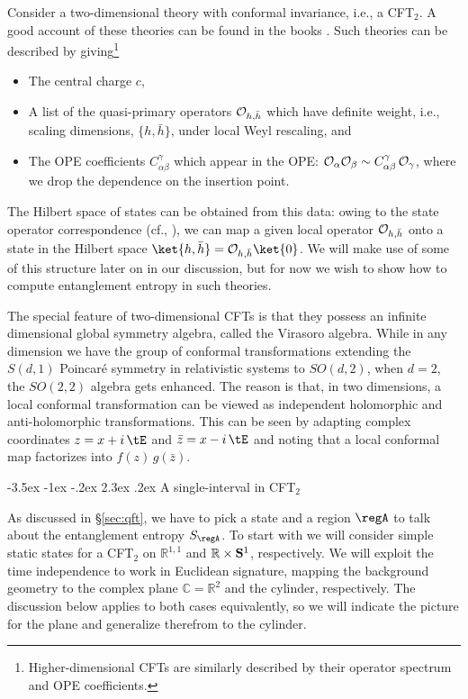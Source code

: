 \documentclass[12pt,openany]{book}
\makeatletter
\renewcommand\section{\@startsection {section}{1}{\z@}%
                                   {-3.5ex \@plus -1ex \@minus -.2ex}%
                                   {2.3ex \@plus.2ex}%
                                   {\normalfont\large\bfseries}}
\makeatother
\begin{document}
Consider a two-dimensional theory with conformal invariance, i.e., a CFT$_2$. A good account of these theories can be found in the books \cite{Ginsparg:1988ui,DiFrancesco:1997nk}. Such theories can be described by giving\footnote{ Higher-dimensional CFTs are similarly described by their operator spectrum and OPE coefficients.}
\begin{itemize}
\item The central charge $c$,
\item A list of the quasi-primary operators ${\cal O}_{h,\bar{h}}$ which have definite weight, i.e., scaling dimensions, $\{h, \bar{h}\}$, under local Weyl rescaling, and
\item The OPE coefficients $C_{\alpha \beta}^\gamma$ which appear in the OPE: ${\cal O}_\alpha {\cal O}_\beta \sim C_{\alpha\beta}^\gamma\, {\cal O}_\gamma$, where we drop the dependence on the insertion point.
\end{itemize}
The Hilbert space of states can be obtained from this data: owing to the state operator correspondence
(cf., \cite{DiFrancesco:1997nk}), we can map a given local operator ${\cal O}_{h, \bar{h}} $ onto a state in the Hilbert space $\ket{h,\bar{h}} =
{\cal O}_{h,\bar{h}} \ket{0}$.
We will make use of some of this structure later on in our discussion, but for now we wish to show how to compute entanglement entropy in such theories.

The special feature of two-dimensional CFTs is that they possess an infinite dimensional global symmetry algebra, called the Virasoro algebra. While in any dimension we have the group of conformal transformations extending the $S(d,1)$ Poincar\'e symmetry in relativistic systems to $SO(d,2)$, when $d=2$, the $SO(2,2)$ algebra gets enhanced. The reason is that, in two dimensions, a local conformal transformation can be viewed as independent holomorphic and anti-holomorphic transformations. This can be seen by adapting complex coordinates $z = x+ i\,\tE$ and $\bar{z} = x-i\,\tE$ and noting that a local conformal map factorizes into $f(z) \, g(\bar{z})$.  


\section{A single-interval in CFT$_2$}

As discussed in \S\ref{sec:qft}, we have to pick a state and a region $\regA$ to talk about the entanglement entropy $S_\regA$. To start with we will consider simple static states for a CFT$_2$ on ${\mathbb R}^{1,1}$ and ${\mathbb R} \times {\bf S}^1$, respectively. We will exploit the time independence to work in Euclidean signature,  mapping the background geometry to the complex plane ${\mathbb C} = {\mathbb R}^2$ and the cylinder, respectively. The discussion below applies to both cases equivalently, so we will indicate the picture for the plane and generalize therefrom to the cylinder.
\end{document}
